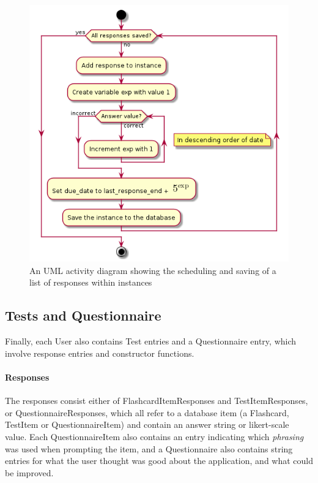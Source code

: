 \begin{figure}
\centering
    \includegraphics[height=.5\textheight]{img/learningserver.png}
\caption{An UML activity diagram showing the scheduling and saving of a list of responses within instances}
\label{fig:learningserver}
\end{figure}

\subsection{Tests and Questionnaire}

Finally, each User also contains Test entries and a Questionnaire entry, which involve response entries and constructor functions.

\paragraph{Responses} The responses consist either of FlashcardItemResponses and TestItemResponses, or QuestionnaireResponses, which all refer to a database item (a Flashcard, TestItem or QuestionnaireItem) and contain an answer string or likert-scale value. Each QuestionnaireItem also contains an entry indicating which \emph{phrasing} was used when prompting the item, and a Questionnaire also contains string entries for what the user thought was good about the application, and what could be improved.

